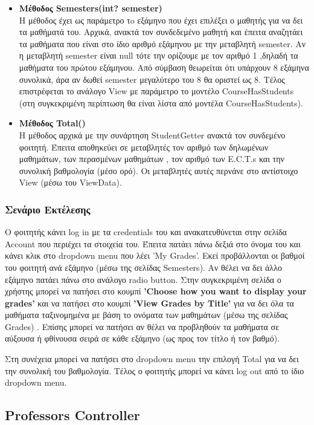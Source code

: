 \documentclass[12pt]{article}
\begin{document}
\begin{itemize}
	
	\item \textbf{Μέθοδος Semesters(int? semester)}\\
	Η μέθοδος έχει ως παράμετρο τo εξάμηνο που έχει επιλέξει ο μαθητής για να δει τα μαθήματά του. Αρχικά, ανακτά τον συνδεδεμένο μαθητή και έπειτα αναζητάει τα μαθήματα που είναι στο ίδιο αριθμό εξάμηνου με την μεταβλητή semester. Αν η μεταβλητή semester είναι null τότε την ορίζουμε με τον αριθμό 1 ,δηλαδή τα μαθήματα του πρώτου εξάμηνου. Από σύμβαση θεωρείται ότι υπάρχουν 8 εξάμηνα συνολικά, άρα αν δωθεί semester μεγαλύτερο του 8 θα οριστεί ως 8. Τέλος επιστρέφεται το ανάλογο View με παράμετρο το μοντέλο CourseHasStudents (στη συγκεκριμένη περίπτωση θα είναι λίστα από μοντέλα CourseHasStudents).
		
	\item \textbf{Μέθοδος Total()}\\
	Η μέθοδος αρχικά με την συνάρτηση StudentGetter ανακτά τον συνδεμένο φοιτητή. Έπειτα αποθηκεύει σε μεταβλητές τον αριθμό των δηλωμένων μαθημάτων, των περασμένων μαθημάτων , τον αριθμό των E.C.T.s και την συνολική βαθμολογία (μέσο ορό). Οι μεταβλητές αυτές περνάνε στο αντίστοιχο View (μέσω του ViewData).
	
\end{itemize}

\subsubsection{Σενάριο Εκτέλεσης}
Ο φοιτητής κάνει log in με τα credentials του και ανακατευθύνεται στην σελίδα Account που περιέχει τα στοιχεία του. Έπειτα πατάει πάνω δεξιά στο όνομα του και κάνει κλικ στο  dropdown menu που λέει 'My Grades'. Εκεί προβάλλονται οι βαθμοί του φοιτητή ανά εξάμηνο (μέσω της σελίδας Semesters).  Αν θέλει να δει άλλο εξάμηνο πατάει πάνω στο ανάλογο radio button. Στην συγκεκριμένη σελίδα ο χρήστης μπορεί να πατήσει στο κουμπί \textbf{'Choose how you want to display your grades'} και να πατήσει στο κουμπί \textbf{'View Grades by Title'} για να δει όλα τα μαθήματα ταξινομημένα με βάση το ονόματα των μαθημάτων (μέσω της σελίδας Grades) . Επίσης μπορεί να πατήσει αν θέλει να προβληθούν τα μαθήματα σε αύξουσα ή φθίνουσα σειρά σε κάθε εξάμηνο (ως προς τον τίτλο ή τον βαθμό). 

Στη συνέχεια μπορεί να πατήσει στο dropdown menu την επιλογή Total για να δει την συνολική του βαθμολογία. Τέλος ο φοιτητής μπορεί να κάνει log out από το ίδιο dropdown menu.
	
\subsection{Professors Controller}
\end{document}
